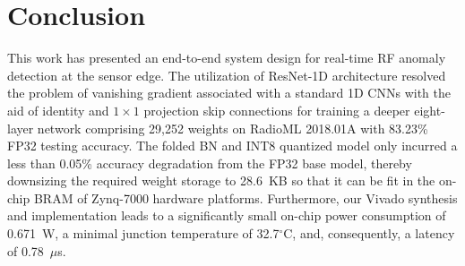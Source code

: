 \documentclass[conference]{IEEEtran}
\begin{document}
\section{Conclusion}
This work has presented an end-to-end system design for real-time RF anomaly detection at the sensor edge. The utilization of ResNet-1D architecture resolved the problem of vanishing gradient associated with a standard 1D CNNs with the aid of identity and $1\times1$ projection skip connections for training a deeper eight-layer network comprising 29,252 weights on RadioML 2018.01A with 83.23\% FP32 testing accuracy. The folded BN and INT8 quantized model only incurred a less than 0.05\% accuracy degradation from the FP32 base model, thereby downsizing the required weight storage to 28.6~KB so that it can be fit in the on-chip BRAM of Zynq-7000 hardware platforms. Furthermore, our Vivado synthesis and implementation leads to a significantly small on-chip power consumption of 0.671~W, a minimal junction temperature of 32.7$^{\circ}$C, and, consequently, a latency of 0.78~$\mu$s.

\end{document}

